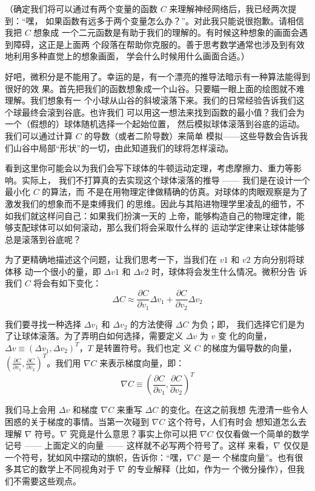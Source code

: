 （确定我们将可以通过有两个变量的函数 $C$ 来理解神经网络后，我已经两次提到：“嘿，
  如果函数有远多于两个变量怎么办？”。对此我只能说很抱歉。请相信我把 $C$ 想象成
  一个二元函数是有助于我们的理解的。有时候这种想象的画面会遇到障碍，这正是上面两
  个段落在帮助你克服的。善于思考数学通常也涉及到有效地利用多种直觉上的想象画面，
  学会什么时候用什么画面合适。）

好吧，微积分是不能用了。幸运的是，有一个漂亮的推导法暗示有一种算法能得到很好的效
果。首先把我们的函数想象成一个山谷。只要瞄一眼上面的绘图就不难理解。我们想象有一
个小球从山谷的斜坡滚落下来。我们的日常经验告诉我们这个球最终会滚到谷底。也许我们
可以用这一想法来找到函数的最小值？我们会为一个（假想的）球体随机选择一个起始位置，
然后模拟球体滚落到谷底的运动。我们可以通过计算 $C$ 的导数（或者二阶导数）来简单
模拟——这些导数会告诉我们山谷中局部“形状”的一切，由此知道我们的球将怎样滚动。

看到这里你可能会以为我们会写下球体的牛顿运动定理，考虑摩擦力、重力等影响。实际上，
我们不打算真的去实现这个球体滚落的推导 —— 我们是在设计一个最小化 $C$ 的算法，而
不是在用物理定律做精确的仿真。对球体的肉眼观察是为了激发我们的想象而不是束缚我们
的思维。因此与其陷进物理学里凌乱的细节，不如我们就这样问自己：如果我们扮演一天的
上帝，能够构造自己的物理定律，能够支配球体可以如何滚动，那么我们将会采取什么样的
运动学定律来让球体能够总是滚落到谷底呢？

为了更精确地描述这个问题，让我们思考一下，当我们在 $v1$ 和 $v2$ 方向分别将球体移
动一个很小的量，即 $\Delta v1$ 和 $\Delta v2$ 时，球体将会发生什么情况。微积分告
诉我们 $C$ 将会有如下变化：
\begin{equation}
  \Delta C \approx \frac{\partial C}{\partial v_1} \Delta v_1 +
  \frac{\partial C}{\partial v_2} \Delta v_2
  \label{eq:7}\tag{7}
\end{equation}

我们要寻找一种选择 $\Delta v_1$ 和 $\Delta v_2$ 的方法使得 $\Delta C$ 为负；即，
我们选择它们是为了让球体滚落。为了弄明白如何选择，需要定义 $\Delta v$ 为 $v$ 变
化的向量，$\Delta v \equiv (\Delta v_1, \Delta v_2)^T$，$T$ 是转置符号。我们也定
义 $C$ 的梯度为偏导数的向量，$\left(\frac{\partial C}{\partial v_1},
\frac{\partial C}{\partial v_2}\right)^T$。我们用 $\nabla C$ 来表示梯度向量，即：
\begin{equation}
  \nabla C \equiv \left( \frac{\partial C}{\partial v_1}, \frac{\partial
      C}{\partial v_2} \right)^T
  \label{eq:8}\tag{8}
\end{equation}

我们马上会用 $\Delta v$ 和梯度 $\nabla C$ 来重写 $\Delta C$ 的变化。在这之前我想
先澄清一些令人困惑的关于梯度的事情。当第一次碰到 $\nabla C$ 这个符号，人们有时会
想知道怎么去理解 $\nabla$ 符号。$\nabla$ 究竟是什么意思？事实上你可以把 $\nabla
C$ 仅仅看做一个简单的数学记号 —— 上面定义的向量 —— 这样就不必写两个符号了。这样
来看，$\nabla$ 仅仅是一个符号，犹如风中摆动的旗帜，告诉你：“嘿，$\nabla C$ 是一
个梯度向量”。也有很多其它的数学上不同视角对于 $\nabla$ 的专业解释（比如，作为一
  个微分操作），但我们不需要这些观点。

